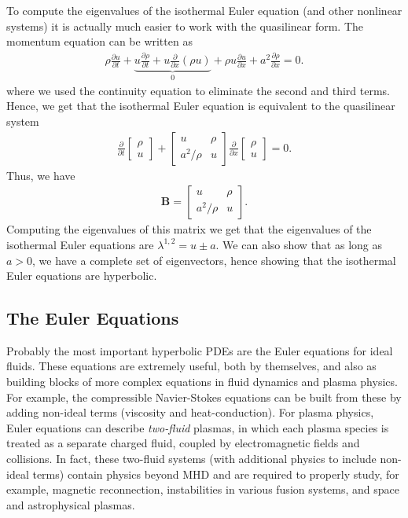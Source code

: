 \documentclass[12pt]{article}
\theoremstyle{definition}
\theoremstyle{definition}
\theoremstyle{definition}
\newcommand{\pfrac}[2]{\frac{\partial #1}{\partial #2}}
\newcommand{\pfraca}[1]{\frac{\partial}{\partial #1}}
\newcommand{\mvec}[1]{\mathbf{#1}}
\begin{document}
To compute the eigenvalues of the isothermal Euler equation (and other
nonlinear systems) it is actually much easier to work with the
quasilinear form. The momentum equation can be written as
\begin{align}
  \rho\pfrac{u}{t} + 
  \underbrace{
  u \pfrac{\rho}{t}
  + u \pfraca{x}(\rho u)
  }_{0}
  + \rho u \pfrac{u}{x}
  +
  a^2 \pfrac{\rho}{x}
  =
  0.
\end{align}
where we used the continuity equation to eliminate the second and
third terms. Hence, we get that the isothermal Euler equation is
equivalent to the quasilinear system
\begin{align}
  \frac{\partial}{\partial{t}}
  \left[
    \begin{matrix}
      \rho \\
      u
    \end{matrix}
  \right]
  +
  \left[
    \begin{matrix}
      u & \rho \\
      a^2/\rho & u
    \end{matrix}
  \right]
  \frac{\partial}{\partial{x}}
  \left[
    \begin{matrix}
      \rho \\
       u
    \end{matrix}
  \right]
  =
  0.
\end{align}
Thus, we have
\begin{align}
  \mvec{B}
  =
  \left[
    \begin{matrix}
      u & \rho \\
      a^2/\rho & u
    \end{matrix}
  \right].  
\end{align}
Computing the eigenvalues of this matrix we get that the eigenvalues
of the isothermal Euler equations are $\lambda^{1,2} = u \pm a$. We
can also show that as long as $a > 0$, we have a complete set of
eigenvectors, hence showing that the isothermal Euler equations are
hyperbolic.

\subsection{The Euler Equations}

Probably the most important hyperbolic PDEs are the Euler equations
for ideal fluids. These equations are extremely useful, both by
themselves, and also as building blocks of more complex equations in
fluid dynamics and plasma physics. For example, the compressible
Navier-Stokes equations can be built from these by adding non-ideal
terms (viscosity and heat-conduction). For plasma physics, Euler
equations can describe \emph{two-fluid} plasmas, in which each plasma
species is treated as a separate charged fluid, coupled by
electromagnetic fields and collisions. In fact, these two-fluid
systems (with additional physics to include non-ideal terms) contain
physics beyond MHD and are required to properly study, for example,
magnetic reconnection, instabilities in various fusion systems, and
space and astrophysical plasmas.
\end{document}
